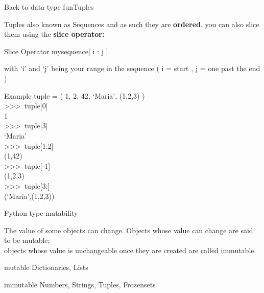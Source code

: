 \documentclass{beamer}
\begin{document}
  \begin{frame}{Back to data type fun}{Tuples}

    Tuples also known as Sequences and as such they are {\bf ordered}.
    you can also slice them using the {\bf slice operator:}

    \begin{block}{Slice Operator}
      \scriptsize
      mysequence[ i : j ]
      
      with `i' and `j' being your range in the sequence ( i = start , j = one past the end )
    \end{block}

    \begin{block}{Example}
      \scriptsize
      tuple = ( 1, 2, 42, `Maria', (1,2,3) )\\

      \textgreater\textgreater\textgreater \ tuple[0]\\
        1\\
      \textgreater\textgreater\textgreater \ tuple[3]\\
        `Maria'\\
      \textgreater\textgreater\textgreater \ tuple[1:2]\\
        (1,42)\\
      \textgreater\textgreater\textgreater \ tuple[-1]\\
        (1,2,3)\\
      \textgreater\textgreater\textgreater \ tuple[3:]\\
        (`Maria',(1,2,3))
    \end{block}

  \end{frame}
  
  \begin{frame}{Python type mutability}
    
    The value of some objects can change. Objects whose value can change are said to be mutable;\\
    objects whose value is unchangeable once they are created are called immutable.
    \begin{block}{mutable}
      Dictionaries, Lists
     \end{block}
     \begin{block}{immutable}
       Numbers, Strings, Tuples, Frozensets
     \end{block}

  \end{frame}
\end{document}
